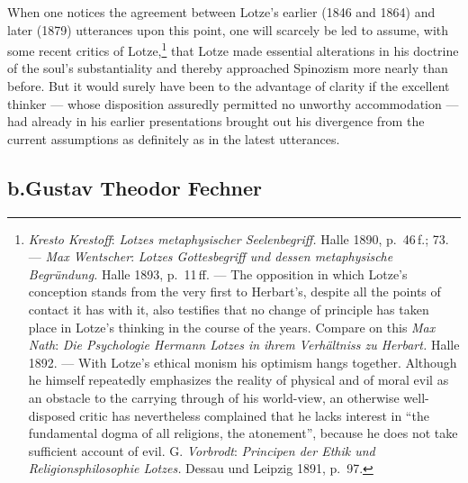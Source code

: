 \documentclass[12pt,a4paper]{book}
\begin{document}
When one notices the agreement between Lotze's earlier (1846 and 1864) and later
(1879) utterances upon this point, one will scarcely be led to assume, with some
recent critics of Lotze,\footnote{\emph{Kresto Krestoff}: \textit{Lotzes
metaphysischer Seelenbegriff.} Halle 1890, p.~46\,f.; 73. --- \emph{Max Wentscher}:
\textit{Lotzes Gottesbegriff und dessen metaphysische Begründung.} Halle 1893,
p.~11\,ff. --- The opposition in which Lotze's conception stands from the very
first to Herbart's, despite all the points of contact it has with it, also
testifies that no change of principle has taken place in Lotze's thinking in the
course of the years. Compare on this \emph{Max Nath}: \textit{Die Psychologie Hermann
Lotzes in ihrem Verhältniss zu Herbart.} Halle 1892. --- With Lotze's ethical
monism his optimism hangs together. Although he himself repeatedly emphasizes the
reality of physical and of moral evil as an obstacle to the carrying through of
his world-view, an otherwise well-disposed critic has nevertheless complained
that he lacks interest in ``the fundamental dogma of all religions, the
atonement'', because he does not take sufficient account of evil. G. \emph{Vorbrodt}:
\textit{Principen der Ethik und Religionsphilosophie Lotzes.} Dessau und Leipzig
1891, p.~97.} that Lotze made essential alterations in his doctrine of the soul's
substantiality and thereby approached Spinozism more nearly than before. But it
would surely have been to the advantage of clarity if the excellent thinker ---
whose disposition assuredly permitted no unworthy accommodation --- had already
in his earlier presentations brought out his divergence from the current
assumptions as definitely as in the latest utterances.

\subsection*{b.\quad Gustav Theodor Fechner}
\end{document}
